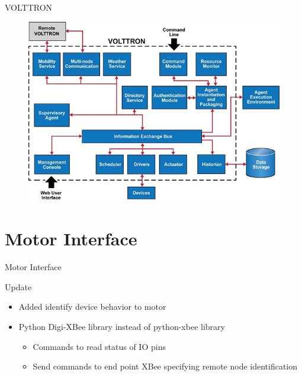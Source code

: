 \documentclass{beamer}
\begin{document}
\begin{frame}{VOLTTRON}
\begin{figure}
\centering
\includegraphics[scale=0.5]{figs/volttronoverview.png}
\end{figure}
\end{frame}

\section{Motor Interface}

\begin{frame}{Motor Interface}
\begin{block}{Update}
\begin{itemize}
\item Added identify device behavior to motor
\item Python Digi-XBee library instead of python-xbee library
\begin{itemize}
	\item Commands to read status of IO pins
	\item Send commands to end point XBee specifying remote node identification
\end{itemize}
\end{itemize}
\end{block}
\end{frame}
\end{document}
